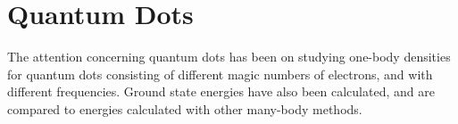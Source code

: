 \section{Quantum Dots}
	The attention concerning quantum dots has been on studying one-body densities for quantum dots consisting of different magic numbers of electrons, and with different frequencies. Ground state energies have also been calculated, and are compared to energies calculated with other many-body methods. 
